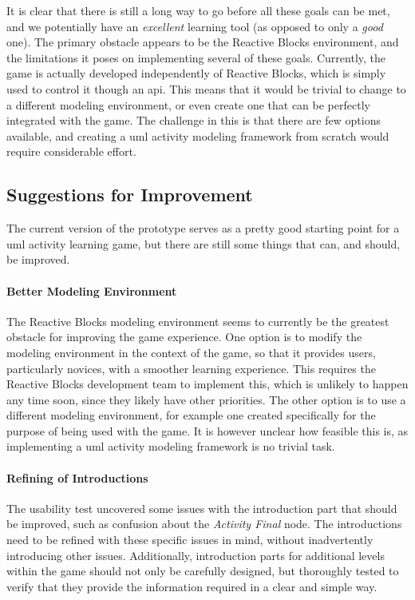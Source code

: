 \noindent
It is clear that there is still a long way to go before all these goals can be met, and we potentially have an \emph{excellent} learning tool (as opposed to only a \emph{good} one). The primary obstacle appears to be the Reactive Blocks environment, and the limitations it poses on implementing several of these goals. Currently, the game is actually developed independently of Reactive Blocks, which is simply used to control it though an \gls{api}. This means that it would be trivial to change to a different modeling environment, or even create one that can be perfectly integrated with the game. The challenge in this is that there are few options available, and creating a \gls{uml} activity modeling framework from scratch would require considerable effort.

\subsection{Suggestions for Improvement}
\label{sec:game_improvement}
The current version of the prototype serves as a pretty good starting point for a \gls{uml} activity learning game, but there are still some things that can, and should, be improved.

\paragraph{Better Modeling Environment} The Reactive Blocks modeling environment seems to currently be the greatest obstacle for improving the game experience. One option is to modify the modeling environment in the context of the game, so that it provides users, particularly novices, with a smoother learning experience. This requires the Reactive Blocks development team to implement this, which is unlikely to happen any time soon, since they likely have other priorities. The other option is to use a different modeling environment, for example one created specifically for the purpose of being used with the game. It is however unclear how feasible this is, as implementing a \gls{uml} activity modeling framework is no trivial task.

\paragraph{Refining of Introductions} The usability test uncovered some issues with the introduction part that should be improved, such as confusion about the \emph{Activity Final} node. The introductions need to be refined with these specific issues in mind, without inadvertently introducing other issues. Additionally, introduction parts for additional levels within the game should not only be carefully designed, but thoroughly tested to verify that they provide the information required in a clear and simple way.


